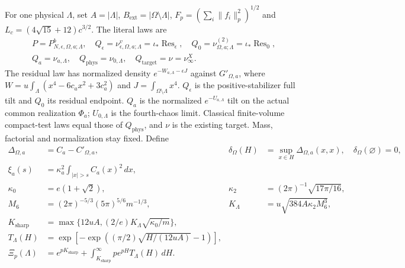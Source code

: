 For one physical $\Lambda$, set $A=|\Lambda|$,
$B_{\mathrm{ext}}=|\Omega\setminus\Lambda|$,
$F_p=(\sum_i\|f_i\|_p^2)^{1/2}$ and
$L_c=(4\sqrt{15}+12)c^{3/2}$. The literal laws are
\begin{gather*}
 P=P^b_{N,\epsilon,\Omega,a;\Lambda},\quad
 Q_\epsilon=\nu^v_{\epsilon,\Omega,a;\Lambda}=\iota_*\operatorname{Res}_\epsilon,
 \quad Q_0=\nu^{(2)}_{\Omega,a;\Lambda}=\iota_*\operatorname{Res}_0,\\
 Q_a=\nu_{a,\Lambda},\quad Q_{\mathrm{phys}}=\nu_{0,\Lambda},
 \quad Q_{\mathrm{target}}=\nu=\nu_\infty^X.
\end{gather*}
The residual law has normalized density $e^{-W_{a,\Lambda}-\epsilon J}$
against $G'_{\Omega,a}$, where
$W=u\int_\Lambda(x^4-6c_ax^2+3c_a^2)$ and
$J=\int_{\Omega\setminus\Lambda}x^4$.
$Q_\epsilon$ is the positive-stabilizer full tilt and $Q_0$ its residual
endpoint. $Q_a$ is the normalized $e^{-U_{a,\Lambda}}$ tilt on the actual
common realization $\Phi_a$; $U_{0,\Lambda}$ is the fourth-chaos limit.
Classical finite-volume compact-test laws equal those of $Q_{\mathrm{phys}}$,
and $\nu$ is the existing target. Mass, factorial and normalization stay fixed.
Define
\begin{align*}
 \Delta_{\Omega,a}&=C_a-C'_{\Omega,a},&
 \delta_\Omega(H)&=\sup_{x\in H}\Delta_{\Omega,a}(x,x),
 \quad\delta_\Omega(\varnothing)=0,\\
 \xi_a(s)&=\kappa_a^2\int_{|x|>s}C_a(x)^2\,dx,\\
 \kappa_0&=e(1+\sqrt2),&\kappa_2&=(2\pi)^{-1}\sqrt{17\pi/16},\\
 M_6&=(2\pi)^{-5/3}(5\pi)^{5/6}m^{-1/3},&
 K_\Lambda&=u\sqrt{384A\kappa_2M_6^3},\\
 K_{\mathrm{sharp}}&=\max\{12uA,(2/e)K_\Lambda\sqrt{\kappa_0/m}\},\\
 T_\Lambda(H)&=\exp[-\exp((\pi/2)\sqrt{H/(12uA)}-1)],\\
 \Xi_p(\Lambda)&=e^{pK_{\mathrm{sharp}}}
    +\int_{K_{\mathrm{sharp}}}^\infty pe^{pH}T_\Lambda(H)\,dH.
\end{align*}

